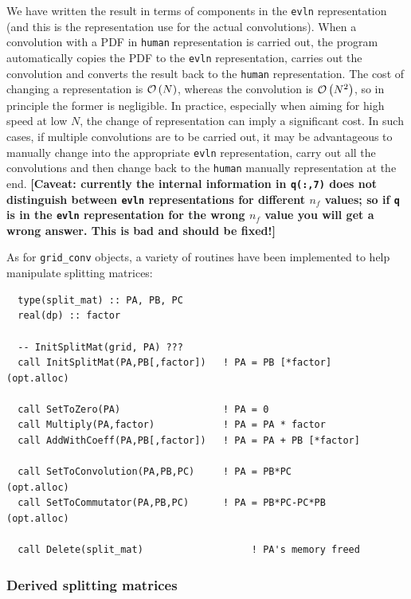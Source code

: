 \documentclass[12pt]{article}
\newcommand{\comment}[1]{\textbf{[#1]}}
\newcommand{\ttt}[1]{\texttt{#1}}
\newcommand{\order}[1]{{\cal O}\left(#1\right)}
\begin{document}
We have written the result in terms of components in the \ttt{evln}
representation (and this is the representation use for the actual
convolutions). When a convolution with a PDF in \ttt{human}
representation is carried out, the program automatically copies the
PDF to the \ttt{evln} representation, carries out the convolution and
converts the result back to the \ttt{human} representation.
%
The cost of changing a representation is $\order{N}$, whereas the
convolution is $\order{N^2}$, so in principle the former is
negligible. In practice, especially when aiming for high speed at low
$N$, the change of representation can imply a significant cost. In
such cases, if multiple convolutions are to be carried out, it may be
advantageous to manually change into the appropriate \ttt{evln}
representation, carry out all the convolutions and then change back to
the \ttt{human} manually representation at the end.
%
\comment{Caveat: currently the internal information in \ttt{q(:,7)}
  does not distinguish between \ttt{evln} representations for
  different $n_f$ values; so if \ttt{q} is in the \ttt{evln}
  representation for the wrong $n_f$ value you will get a wrong
  answer. This is bad and should be fixed!}

As for \ttt{grid\_conv} objects, a variety of routines have been
implemented to help manipulate splitting matrices:
\begin{verbatim}
  type(split_mat) :: PA, PB, PC
  real(dp) :: factor

  -- InitSplitMat(grid, PA) ???
  call InitSplitMat(PA,PB[,factor])   ! PA = PB [*factor]   (opt.alloc)

  call SetToZero(PA)                  ! PA = 0
  call Multiply(PA,factor)            ! PA = PA * factor               
  call AddWithCoeff(PA,PB[,factor])   ! PA = PA + PB [*factor]

  call SetToConvolution(PA,PB,PC)     ! PA = PB*PC          (opt.alloc)
  call SetToCommutator(PA,PB,PC)      ! PA = PB*PC-PC*PB    (opt.alloc)
  
  call Delete(split_mat)                   ! PA's memory freed
\end{verbatim}


\subsubsection{Derived splitting matrices}
\label{sec:derived-split-matrices}
\end{document}

